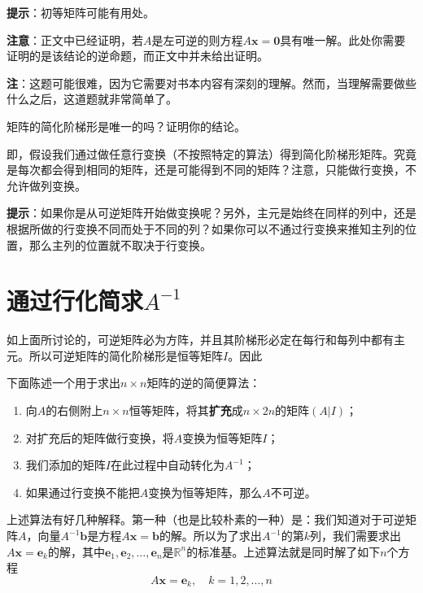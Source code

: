 \begin{problemset}
  {\bf 提示}：初等矩阵可能有用处。
  
  {\bf 注意}：正文中已经证明，若$A$是左可逆的则方程$A\mathbf{x}=\mathbf{0}$具有唯一解。此处你需要证明的是该结论的逆命题，而正文中并未给出证明。

  {\bf 注}：这题可能很难，因为它需要对书本内容有深刻的理解。然而，当理解需要做些什么之后，这道题就非常简单了。
  \item 矩阵的简化阶梯形是唯一的吗？证明你的结论。
  
  即，假设我们通过做任意行变换（不按照特定的算法）得到简化阶梯形矩阵。究竟是每次都会得到相同的矩阵，还是可能得到不同的矩阵？注意，只能做行变换，不允许做列变换。

  {\bf 提示}：如果你是从可逆矩阵开始做变换呢？另外，主元是始终在同样的列中，还是根据所做的行变换不同而处于不同的列？如果你可以不通过行变换来推知主列的位置，那么主列的位置就不取决于行变换。
\end{problemset}

\section{通过行化简求\texorpdfstring{$A^{-1}$}{A的逆}}

如上面所讨论的，可逆矩阵必为方阵，并且其阶梯形必定在每行和每列中都有主元。所以可逆矩阵的简化阶梯形是恒等矩阵$I$。因此
\begin{center}
\end{center}

下面陈述一个用于求出$n\times n$矩阵的逆的简便算法：
\begin{enumerate}
  \item 向$A$的右侧附上$n\times n$恒等矩阵，将其{\bf 扩充}成$n\times 2n$的矩阵$(A|I)$；
  \item 对扩充后的矩阵做行变换，将$A$变换为恒等矩阵$I$；
  \item 我们添加的矩阵$I$在此过程中自动转化为$A^{-1}$；
  \item 如果通过行变换不能把$A$变换为恒等矩阵，那么$A$不可逆。
\end{enumerate}

上述算法有好几种解释。第一种（也是比较朴素的一种）是：我们知道对于可逆矩阵$A$，向量$A^{-1}\mathbf{b}$是方程$A\mathbf{x}=\mathbf{b}$的解。所以为了求出$A^{-1}$的第$k$列，我们需要求出$A\mathbf{x}=\mathbf{e}_k$的解，其中$\mathbf{e}_1,\mathbf{e}_2,\ldots,\mathbf{e}_n$是$\mathbb{R}^n$的标准基。上述算法就是同时解了如下$n$个方程\[A\mathbf{x}=\mathbf{e}_k,\quad k=1,2,\ldots,n\]

